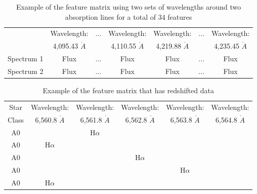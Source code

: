 \documentclass[./AutomatedMK.tex]{subfiles}
\begin{document}
\begin{table}
\renewcommand{\thetable}{\arabic{table}}
\centering

\caption{Example of the feature matrix using two sets of wavelengths around two absorption lines for a total of 34 features} 
\label{tab:feature-matrix2}

	\begin{tabular}{|c|c|c|c||c|c|c|}
\tablewidth{0pt}
	\hline
			     & Wavelength:   & ... &  Wavelength:	 & Wavelength:   & ... & Wavelength:  \\
  			     & 4,095.43 $\mathring{A}$          &     &  4,110.55 $\mathring{A}$         & 4,219.88 $\mathring{A}$          &     &  4,235.45 $\mathring{A}$ \\ \hline
	Spectrum 1 & Flux                   & ... & Flux                   & Flux                   & ... & Flux                   \\ \hline
	Spectrum 2 & Flux                   & ... & Flux                   & Flux                   & ... & Flux                   \\ \hline
	\end{tabular}

\end{table}

\pagebreak
        \begin{table}
        \renewcommand{\thetable}{\arabic{table}}
        \centering
        \caption{Example of the feature matrix that has redshifted data}
        \label{tab:example}

            \begin{tabular}{|c|c|c|c|c|c|}
\tablewidth{0pt}
            \hline 
	Star & Wavelength: & Wavelength:	& Wavelength: & Wavelength: & Wavelength: \\
	Class & 6,560.8 $\mathring{A}$ & 6,561.8 $\mathring{A}$ & 6,562.8 $\mathring{A}$ & 6,563.8 $\mathring{A}$ & 6,564.8 $\mathring{A}$  \\ \hline
               A0 & & H$\alpha$ & & &\\ \hline
               A0 & H$\alpha$ & & & & \\ \hline
               A0 & & & H$\alpha$ & & \\ \hline
               A0 & & & & H$\alpha$ & \\ \hline
               A0 &H$\alpha$ & & & &  \\ \hline
            \end{tabular}
        
        \end{table}
\end{document}
